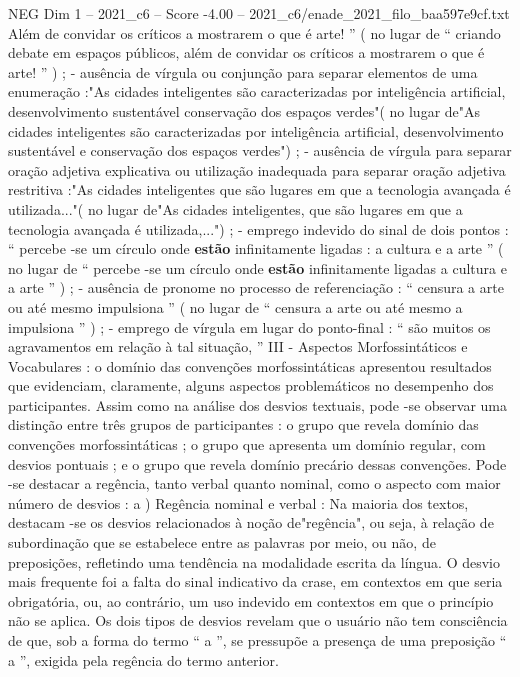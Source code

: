 \begin{textsample}{NEG Dim 1 – 2021\_c6 – Score -4.00 – 2021\_c6/enade\_2021\_filo\_baa597e9cf.txt}
Além de convidar os críticos a mostrarem o que é arte! ” ( no lugar de “ criando debate em espaços públicos, além de convidar os críticos a mostrarem o que é arte! ” ) ; - ausência de vírgula ou conjunção para separar elementos de uma enumeração :"As cidades inteligentes são caracterizadas por inteligência artificial, desenvolvimento sustentável conservação dos espaços verdes"( no lugar de"As cidades inteligentes são caracterizadas por inteligência artificial, desenvolvimento sustentável e conservação dos espaços verdes") ; - ausência de vírgula para separar oração adjetiva explicativa ou utilização inadequada para separar oração adjetiva restritiva :"As cidades inteligentes que são lugares em que a tecnologia avançada é utilizada..."( no lugar de"As cidades inteligentes, que são lugares em que a tecnologia avançada é utilizada,...") ; - emprego indevido do sinal de dois pontos : “ percebe -se um círculo onde \textbf{estão} infinitamente ligadas : a cultura e a arte ” ( no lugar de “ percebe -se um círculo onde \textbf{estão} infinitamente ligadas a cultura e a arte ” ) ; - ausência de pronome no processo de referenciação : “ censura a arte ou até mesmo impulsiona ” ( no lugar de “ censura a arte ou até mesmo a impulsiona ” ) ; - emprego de vírgula em lugar do ponto-final : “ são muitos os agravamentos em relação à tal situação, ” III - Aspectos Morfossintáticos e Vocabulares : o domínio das convenções morfossintáticas apresentou resultados que evidenciam, claramente, alguns aspectos problemáticos no desempenho dos participantes.
Assim como na análise dos desvios textuais, pode -se observar uma distinção entre três grupos de participantes : o grupo que revela domínio das convenções morfossintáticas ; o grupo que apresenta um domínio regular, com desvios pontuais ; e o grupo que revela domínio precário dessas convenções.
Pode -se destacar a regência, tanto verbal quanto nominal, como o aspecto com maior número de desvios : a ) Regência nominal e verbal : Na maioria dos textos, destacam -se os desvios relacionados à noção de"regência", ou seja, à relação de subordinação que se estabelece entre as palavras por meio, ou não, de preposições, refletindo uma tendência na modalidade escrita da língua.
O desvio mais frequente foi a falta do sinal indicativo da crase, em contextos em que seria obrigatória, ou, ao contrário, um uso indevido em contextos em que o princípio não se aplica.
Os dois tipos de desvios revelam que o usuário não tem consciência de que, sob a forma do termo “ a ”, se pressupõe a presença de uma preposição “ a ”, exigida pela regência do termo anterior.

\end{textsample}
